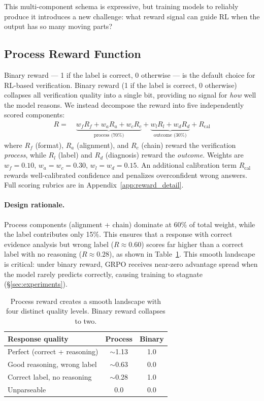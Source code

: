 \documentclass[11pt]{article}
\begin{document}
This multi-component schema is expressive, but training models to reliably produce it introduces a new challenge: what reward signal can guide RL when the output has so many moving parts?

\subsection{Process Reward Function}
\label{sec:reward}

Binary reward --- 1 if the label is correct, 0 otherwise --- is the default choice for RL-based verification.
Binary reward (1 if the label is correct, 0 otherwise) collapses all verification quality into a single bit, providing no signal for \emph{how} well the model reasons.
We instead decompose the reward into five independently scored components:
\begin{align}
R = \; & \underbrace{w_f R_f + w_a R_a + w_c R_c}_{\text{process (70\%)}} + \underbrace{w_l R_l + w_d R_d}_{\text{outcome (30\%)}} + R_{\text{cal}}
\label{eq:reward_full}
\end{align}
where $R_f$ (format), $R_a$ (alignment), and $R_c$ (chain) reward the verification \emph{process}, while $R_l$ (label) and $R_d$ (diagnosis) reward the \emph{outcome}.
Weights are $w_f{=}0.10$, $w_a{=}w_c{=}0.30$, $w_l{=}w_d{=}0.15$.
An additional calibration term $R_{\text{cal}}$ rewards well-calibrated confidence and penalizes overconfident wrong answers.
Full scoring rubrics are in Appendix~\ref{app:reward_detail}.

\paragraph{Design rationale.}
Process components (alignment + chain) dominate at 60\% of total weight, while the label contributes only 15\%.
This ensures that a response with correct evidence analysis but wrong label ($R \approx 0.60$) scores far higher than a correct label with no reasoning ($R \approx 0.28$), as shown in Table~\ref{tab:reward_landscape}.
This smooth landscape is critical: under binary reward, GRPO receives near-zero advantage spread when the model rarely predicts correctly, causing training to stagnate (\S\ref{sec:experiments}).

\begin{table}[t]
\centering
\small
\caption{Process reward creates a smooth landscape with four distinct quality levels. Binary reward collapses to two.}
\label{tab:reward_landscape}
\setlength{\tabcolsep}{4pt}
\begin{tabular}{lcc}
\toprule
\textbf{Response quality} & \textbf{Process} & \textbf{Binary} \\
\midrule
Perfect (correct + reasoning) & $\sim$1.13 & 1.0 \\
Good reasoning, wrong label & $\sim$0.63 & 0.0 \\
Correct label, no reasoning & $\sim$0.28 & 1.0 \\
Unparseable & 0.0 & 0.0 \\
\bottomrule
\end{tabular}
\end{table}
\end{document}
